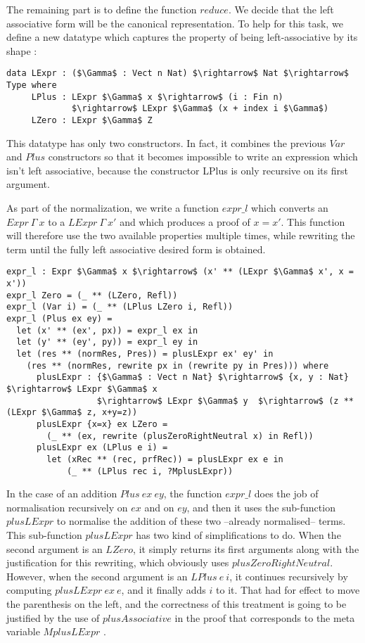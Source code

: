 The remaining part is to define the function $reduce$. We decide that the left associative form will be the canonical representation. To help for this task, we define a new datatype which captures the property of being left-associative by its shape :

\begin{lstlisting}
data LExpr : ($\Gamma$ : Vect n Nat) $\rightarrow$ Nat $\rightarrow$ Type where
     LPlus : LExpr $\Gamma$ x $\rightarrow$ (i : Fin n) 
             $\rightarrow$ LExpr $\Gamma$ (x + index i $\Gamma$)
     LZero : LExpr $\Gamma$ Z
\end{lstlisting}


This datatype has only two constructors. In fact, it combines the previous $Var$ and $Plus$ constructors so that it becomes impossible to write an expression which isn't left associative, because the constructor LPlus is only recursive on its first argument.
 
As part of the normalization, we write a function $expr\_l$ which converts an $Expr\ \Gamma\ x$ to a $LExpr\ \Gamma\ x'$ and which produces a proof of $x=x'$. This function will therefore use the two available properties multiple times, while rewriting the term until the fully left associative desired form is obtained.


\begin{lstlisting}
expr_l : Expr $\Gamma$ x $\rightarrow$ (x' ** (LExpr $\Gamma$ x', x = x'))
expr_l Zero = (_ ** (LZero, Refl))
expr_l (Var i) = (_ ** (LPlus LZero i, Refl))
expr_l (Plus ex ey) = 
  let (x' ** (ex', px)) = expr_l ex in
  let (y' ** (ey', py)) = expr_l ey in
  let (res ** (normRes, Pres)) = plusLExpr ex' ey' in
    (res ** (normRes, rewrite px in (rewrite py in Pres))) where 
      plusLExpr : {$\Gamma$ : Vect n Nat} $\rightarrow$ {x, y : Nat} $\rightarrow$ LExpr $\Gamma$ x 
                  $\rightarrow$ LExpr $\Gamma$ y  $\rightarrow$ (z ** (LExpr $\Gamma$ z, x+y=z))
      plusLExpr {x=x} ex LZero =
        (_ ** (ex, rewrite (plusZeroRightNeutral x) in Refl))            
      plusLExpr ex (LPlus e i) =
        let (xRec ** (rec, prfRec)) = plusLExpr ex e in
            (_ ** (LPlus rec i, ?MplusLExpr))

\end{lstlisting}

In the case of an addition $Plus\ ex\ ey$, the function $expr\_l$ does the job of normalisation recursively on $ex$ and on $ey$, and then it uses the sub-function $plusLExpr$ to normalise the addition of these two --already normalised-- terms. This sub-function $plusLExpr$ has two kind of simplifications to do. When the second argument is an $LZero$, it simply returns its first arguments along with the justification for this rewriting, which obviously uses $plusZeroRightNeutral$. However, when the second argument is an $LPlus\ e\ i$, it continues recursively by computing $plusLExpr\ ex\ e$, and it finally adds $i$ to it. That had for effect to move the parenthesis on the left, and the correctness of this treatment is going to be justified by the use of $plusAssociative$ in the proof that corresponds to the meta variable $MplusLExpr$ .

